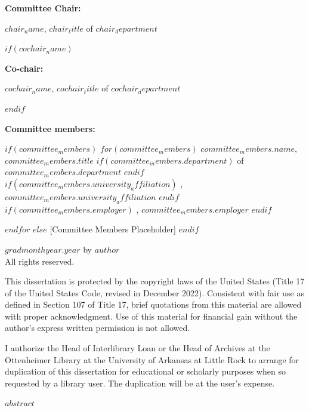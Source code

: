 \documentclass[$if(font_size)$$font_size$$else$12pt$endif$]{book}
\newcommand{\authorname}{$author$}
\newcommand{\authorname}{[Author Placeholder]}
\newcommand{\submissiontype}{dissertation}
\newcommand{\submissiontype}{thesis}
\newcommand{\submissiontype}{thesis}
\newcommand{\submissiontype}{[Submission Type Placeholder]}
\newcommand{\gradyear}{$gradmonthyear.year$}
\newcommand{\gradyear}{[Year]}
\newcommand{\chairname}{$chair_name$}
\newcommand{\chairname}{[Chair Name]}
\newcommand{\chairtitle}{$chair_title$}
\newcommand{\chairtitle}{[Chair Title]}
\newcommand{\chairdepartment}{$chair_department$}
\newcommand{\chairdepartment}{[Chair Department]}
\newcommand{\cochairname}{$cochair_name$}
\newcommand{\cochairname}{}
\newcommand{\cochairtitle}{$cochair_title$}
\newcommand{\cochairtitle}{}
\newcommand{\cochairdepartment}{$cochair_department$}
\newcommand{\cochairdepartment}{}
\newcommand{\committeemembers}{
$if(committee_members)$
$for(committee_members)$
\noindent $committee_members.name$, $committee_members.title$%
$if(committee_members.department)$
{} of $committee_members.department$%
$endif$
$if(committee_members.university_affiliation)$
, $committee_members.university_affiliation$%
$endif$
$if(committee_members.employer)$
, $committee_members.employer$%
$endif$
\par
$endfor$
$else$
[Committee Members Placeholder]
$endif$
}
\begin{document}
\begin{titlepage}
\begin{flushleft}
        \vspace{0.5cm}
        {\normalsize\bfseries\sffamily Committee Chair: \par}
        \chairname, \chairtitle{} of \chairdepartment \par
        $if(cochair_name)$
        {\normalsize\bfseries\sffamily Co-chair: \par}
        \cochairname, \cochairtitle{} of \cochairdepartment \par
        $endif$
        \vspace{1cm}
        {\normalsize\bfseries\sffamily Committee members: \par}
        \committeemembers
    \end{flushleft}
\end{titlepage}

\newpage
\thispagestyle{fancy}
\setcounter{page}{2}
\begin{flushleft}
    \singlespacing
    \textcopyright{} \gradyear{} by \authorname \\
    All rights reserved. \\
    \vspace{1.5cm}
    {\large\bfseries{} \par}
    \vspace{.5cm}
    This \submissiontype{} is protected by the copyright laws of the United States (Title 17 of the United States Code, revised in December 2022). Consistent with fair use as defined in Section 107 of Title 17, brief quotations from this material are allowed with proper acknowledgment. Use of this material for financial gain without the author’s express written permission is not allowed. \\
    \vspace{1.5cm}
    {\large\bfseries{} \par}
    \vspace{.5cm}
    I authorize the Head of Interlibrary Loan or the Head of Archives at the Ottenheimer Library at the University of Arkansas at Little Rock to arrange for duplication of this \submissiontype{} for educational or scholarly purposes when so requested by a library user. The duplication will be at the user’s expense.
\end{flushleft}

\newpage
\thispagestyle{fancy}
\begin{flushleft}
    {\large\bfseries{} \par}
    \vspace{.5cm}
    \doublespacing
    $abstract$
\end{flushleft}
\end{document}
